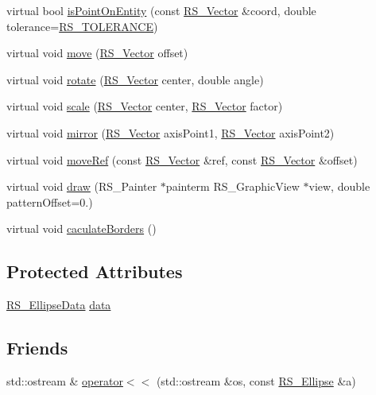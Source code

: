 \begin{DoxyCompactItemize}
\item 
virtual bool \hyperlink{class_r_s___ellipse_a6bbefd3f68c81cee04e6c5ec082e6145}{is\-Point\-On\-Entity} (const \hyperlink{class_r_s___vector}{R\-S\-\_\-\-Vector} \&coord, double tolerance=\hyperlink{rs__math_8h_a64fbba706c478190ec28b503699cf736}{R\-S\-\_\-\-T\-O\-L\-E\-R\-A\-N\-C\-E})
\item 
virtual void \hyperlink{class_r_s___ellipse_af36c40758ab4f8fbc7eb455b9cfe47b9}{move} (\hyperlink{class_r_s___vector}{R\-S\-\_\-\-Vector} offset)
\item 
virtual void \hyperlink{class_r_s___ellipse_a1ba1a8de7884a0b01dccff2ecc06d751}{rotate} (\hyperlink{class_r_s___vector}{R\-S\-\_\-\-Vector} center, double angle)
\item 
virtual void \hyperlink{class_r_s___ellipse_a5858b20d33b6238057788f33010f864d}{scale} (\hyperlink{class_r_s___vector}{R\-S\-\_\-\-Vector} center, \hyperlink{class_r_s___vector}{R\-S\-\_\-\-Vector} factor)
\item 
virtual void \hyperlink{class_r_s___ellipse_a5cb9505738f4971091cebd23d9f3f743}{mirror} (\hyperlink{class_r_s___vector}{R\-S\-\_\-\-Vector} axis\-Point1, \hyperlink{class_r_s___vector}{R\-S\-\_\-\-Vector} axis\-Point2)
\item 
virtual void \hyperlink{class_r_s___ellipse_a0f35541bfc93540d0747c48ea62c9652}{move\-Ref} (const \hyperlink{class_r_s___vector}{R\-S\-\_\-\-Vector} \&ref, const \hyperlink{class_r_s___vector}{R\-S\-\_\-\-Vector} \&offset)
\item 
virtual void \hyperlink{class_r_s___ellipse_a53e65f04265d6fe9306ba546468e3200}{draw} (R\-S\-\_\-\-Painter $\ast$painterm R\-S\-\_\-\-Graphic\-View $\ast$view, double pattern\-Offset=0.)
\item 
virtual void \hyperlink{class_r_s___ellipse_ab3aecd505dcdbb6ff9a0aa86ce714f2e}{caculate\-Borders} ()
\end{DoxyCompactItemize}
\subsection*{Protected Attributes}
\begin{DoxyCompactItemize}
\item 
\hyperlink{class_r_s___ellipse_data}{R\-S\-\_\-\-Ellipse\-Data} \hyperlink{class_r_s___ellipse_a15e5c0207f7c2d4ed22fc6dff591ea06}{data}
\end{DoxyCompactItemize}
\subsection*{Friends}
\begin{DoxyCompactItemize}
\item 
std\-::ostream \& \hyperlink{class_r_s___ellipse_ad00ab5090365079db839b507c9670794}{operator$<$$<$} (std\-::ostream \&os, const \hyperlink{class_r_s___ellipse}{R\-S\-\_\-\-Ellipse} \&a)
\end{DoxyCompactItemize}


